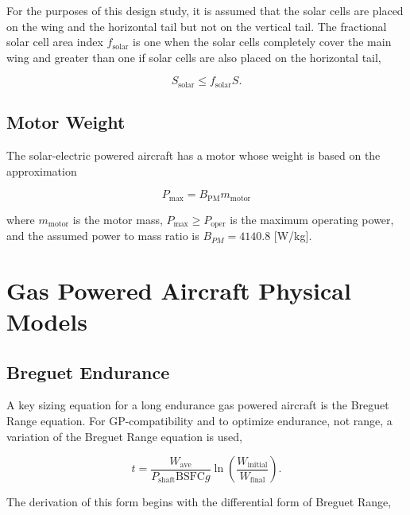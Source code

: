 For the purposes of this design study, it is assumed that the solar cells are placed on the wing and the horizontal tail but not on the vertical tail. 
The fractional solar cell area index $f_{\text{solar}}$ is one when the solar cells completely cover the main wing and greater than one if solar cells are also placed on the horizontal tail,

\begin{equation}
    \label{e:solarssolar}
    S_{\text{solar}} \leq f_{\text{solar}}S.
\end{equation}

\subsection{Motor Weight}

The solar-electric powered aircraft has a motor whose weight is based on the approximation\cite{electricengine}

\begin{equation}
    \label{e:electricengine}
    P_{\text{max}} = B_{\text{PM}} m_{\text{motor}}
\end{equation}

where $m_{\text{motor}}$ is the motor mass, $P_{\text{max}} \geq P_{\text{oper}}$ is the maximum operating power, and the assumed power to mass ratio is $B_{PM} = 4140.8$ [W/kg]. \\

\section{Gas Powered Aircraft Physical Models}

\subsection{Breguet Endurance}

A key sizing equation for a long endurance gas powered aircraft is the Breguet Range equation.  
For GP-compatibility and to optimize endurance, not range, a variation of the Breguet Range equation is used, 

\begin{equation}
    \label{e:breguetendurance}
    t = \frac{W_{\text{ave}}}{P_{\text{shaft}}\text{BSFC}g} \ln{\left( \frac{W_{\text{initial}}}{W_{\text{final}}}\right)}.
\end{equation}

The derivation of this form begins with the differential form of Breguet Range,\cite{br2}

